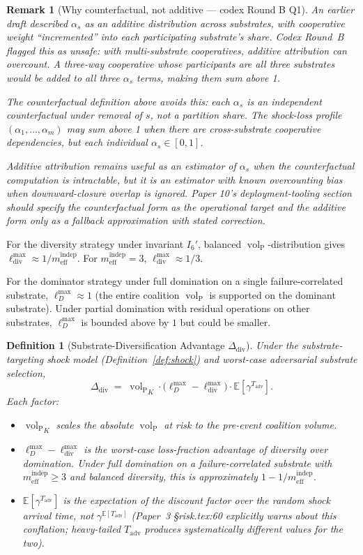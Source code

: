\documentclass{article}
\newtheorem{definition}{Definition}
\newtheorem{remark}{Remark}
\DeclareMathOperator{\vol}{vol}
\newcommand{\volL}{{\vol_{\mathrm{P}}}}
\newcommand{\mindep}{m_{\mathrm{eff}}^{\mathrm{indep}}}
\newcommand{\Tadv}{T_{\mathrm{adv}}}
\newcommand{\Ddiv}{\Delta_{\mathrm{div}}}
\newcommand{\lossDmax}{\ell_D^{\max}}
\newcommand{\lossdivmax}{\ell_{\mathrm{div}}^{\max}}
\begin{document}
\begin{remark}[Why counterfactual, not additive --- codex Round B Q1]
\label{rem:counterfactual_alpha}
An earlier draft described $\alpha_s$ as an additive distribution
across substrates, with cooperative weight ``incremented'' into each
participating substrate's share.  Codex Round~B flagged this as
unsafe: with multi-substrate cooperatives, additive attribution can
overcount.  A three-way cooperative whose participants are all three
substrates would be added to all three $\alpha_s$ terms, making them
sum above 1.

The counterfactual definition above avoids this: each $\alpha_s$ is
an independent counterfactual under removal of $s$, not a partition
share.  The shock-loss profile $(\alpha_1, \ldots, \alpha_m)$ may
sum above 1 when there are cross-substrate cooperative
dependencies, but each individual $\alpha_s \in [0, 1]$.

Additive attribution remains useful as an \emph{estimator} of $\alpha_s$
when the counterfactual computation is intractable, but it is an
estimator with known overcounting bias when downward-closure overlap
is ignored.  Paper 10's deployment-tooling section should specify the
counterfactual form as the operational target and the additive form
only as a fallback approximation with stated correction.
\end{remark}

For the diversity strategy under invariant $I_6'$, balanced
$\volL$-distribution gives $\lossdivmax \approx 1/\mindep$.  For
$\mindep = 3$, $\lossdivmax \approx 1/3$.

For the dominator strategy under full domination on a single
failure-correlated substrate, $\lossDmax \approx 1$ (the entire
coalition $\volL$ is supported on the dominant substrate).  Under
partial domination with residual operations on other substrates,
$\lossDmax$ is bounded above by $1$ but could be smaller.

\begin{definition}[Substrate-Diversification Advantage $\Ddiv$]
\label{def:ddiv}
Under the substrate-targeting shock model
(Definition~\ref{def:shock}) and worst-case adversarial substrate
selection,
\[
  \Ddiv \;=\; \volL_K \cdot \bigl(\lossDmax - \lossdivmax\bigr)
  \cdot \mathbb{E}\!\left[\gamma^{\Tadv}\right].
\]
Each factor:
\begin{itemize}
\item $\volL_K$ scales the absolute $\volL$ at risk to the
  pre-event coalition volume.
\item $\lossDmax - \lossdivmax$ is the worst-case loss-fraction
  advantage of diversity over domination.  Under full domination on
  a failure-correlated substrate with $\mindep \geq 3$ and balanced
  diversity, this is approximately $1 - 1/\mindep$.
\item $\mathbb{E}[\gamma^{\Tadv}]$ is the expectation of the discount
  factor over the random shock arrival time, \emph{not}
  $\gamma^{\mathbb{E}[\Tadv]}$ (Paper~3 \S risk.tex:60 explicitly
  warns about this conflation; heavy-tailed $\Tadv$ produces
  systematically different values for the two).
\end{itemize}
\end{definition}
\end{document}
